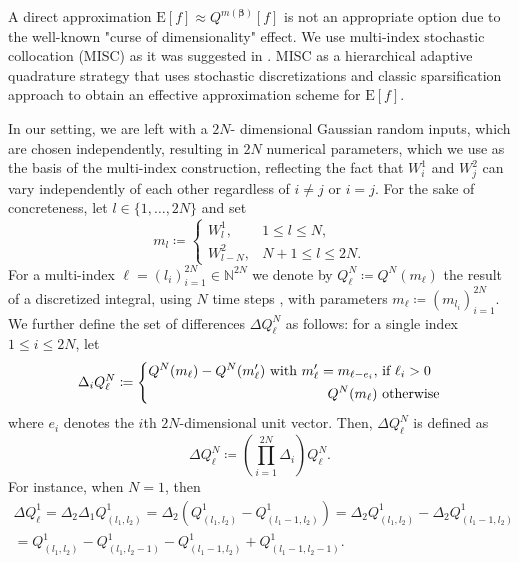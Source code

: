 \documentclass[11pt]{article}
\newcommand{\expt}[1]{\mathrm{E}\left[#1\right]}
\begin{document}
A direct approximation $\expt{f} \approx Q^{m(\boldsymbol{\beta})}[f]$ is not an appropriate option  due to the well-known "curse of dimensionality" effect. We use multi-index stochastic collocation (MISC) as it was suggested  in \cite{haji2016multi}. MISC as a hierarchical adaptive quadrature strategy that uses  stochastic discretizations  and classic sparsification approach to obtain an effective approximation scheme for $\expt{f}$. 


In our setting, we are left with a $2N$- dimensional Gaussian random inputs, which are chosen independently, resulting in  $2N$ numerical parameters, which we use as the basis of the multi-index construction, reflecting the fact that $W^1_i$ and $W^2_j$ can vary independently of each other regardless of $i \neq j$ or $i = j$. For the sake
of concreteness, let $l \in \{1, \ldots, 2N\}$ and set
\begin{equation}
m_l \coloneqq
\begin{cases}
W^1_l, & 1 \le l \le N,\\
W^2_{l-N}, & N+1 \le l \le 2N.
\end{cases}
\end{equation}
For a multi-index $\ell = (l_i)_{i=1}^{2N} \in \mathbb{N}^{2N}$ we denote by
$Q^N_\ell \coloneqq Q^N(m_{\ell})$ the result of a discretized
integral, using $N$ time steps , with parameters $m_\ell \coloneqq (m_{l_i})_{i=1}^{2N}$. We further define the set of
differences $\Delta Q^N_\ell$ as follows: for a single index $1 \le i \le 2N$,
let
\begin{equation}
\Delta_i Q^N_\ell \coloneqq \left\{ 
\aligned 
Q^N(m_\ell) - Q^N(m_\ell') \text{ with } m_\ell' =
m_{\ell - e_i}, & \text{ if } \ell_i>0 \\
Q^N(m_\ell) & \text{ otherwise}
\endaligned
\right.
\end{equation}
where $e_i$ denotes the $i$th $2N$-dimensional unit vector. Then, $\Delta
Q^N_\ell$ is defined as
\begin{equation}
\Delta Q^N_\ell \coloneqq \left( \prod_{i=1}^{2N} \Delta_i \right) Q^N_\ell.
\end{equation}
For instance, when $N = 1$, then 
\begin{multline*}
	\Delta Q^1_\ell = \Delta_2 \Delta_1 Q^1_{(l_1, l_2)} = \Delta_2\left( Q^1_{(l_1,
		l_2)} - Q^1_{(l_1-1,l_2)} \right) = \Delta_2 Q^1_{(l_1,
		l_2)} - \Delta_2 Q^1_{(l_1-1,l_2)} 
	\\= Q^1_{(l_1, l_2)} - Q^1_{(l_1, l_2-1)} - Q^1_{(l_1-1, l_2)} + Q^1_{(l_1-1, l_2-1)}.
\end{multline*}
\end{document}

